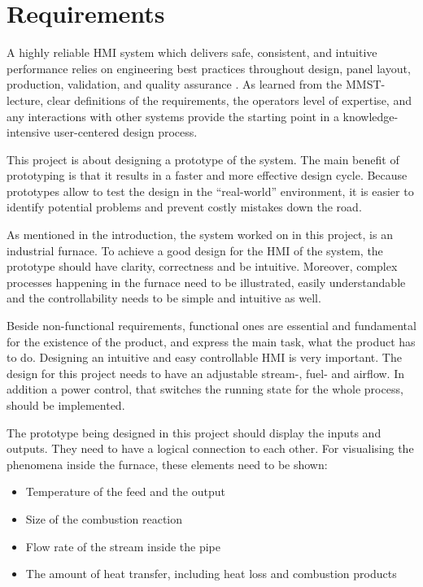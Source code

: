 \section*{Requirements}

 A highly reliable \ac{HMI} system which delivers safe, consistent, and intuitive performance relies on engineering best practices throughout design, panel layout, production, validation, and quality assurance \cite{DesignHMI}. As learned from the \ac{MMST}-lecture, clear definitions of the requirements, the operators level of expertise, and any interactions with other systems provide the starting point in a knowledge-intensive user-centered design process. 

This project is about designing a prototype of the system. The main benefit of prototyping is that it results in a faster and more effective design cycle. Because prototypes allow to test the design in the “real-world” environment, it is easier to identify potential problems and prevent costly mistakes down the road.

As mentioned in the introduction, the system worked on in this project, is an industrial furnace. To achieve a good design for the \ac{HMI} of the system, the prototype should have clarity, correctness and be intuitive. Moreover, complex processes happening in the furnace need to be illustrated, easily understandable and the controllability needs to be simple and intuitive as well.

Beside non-functional requirements, functional ones are essential and fundamental for the existence of the product, and express the main task, what the product has to do.
Designing an intuitive and easy controllable \ac{HMI} is very important. The design for this project needs to have an adjustable stream-, fuel- and airflow. In addition a power control, that switches the running state for the whole process, should be implemented.

The prototype being designed in this project should display the inputs and outputs. They need to have a logical connection to each other. For visualising the phenomena inside the furnace, these elements need to be shown:

\begin{itemize}
  \item Temperature of the feed and the output
  \item Size of the combustion reaction 
  \item Flow rate of the stream inside the pipe
  \item The amount of heat transfer, including heat loss and combustion products
\end{itemize}

